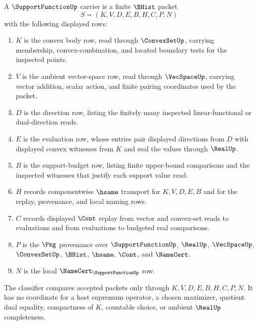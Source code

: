 \begin{definition}
\label{def:support-function-carrier}
A $\SupportFunctionUp$ carrier is a finite $\BHist$ packet
$$
S=(K,V,D,E,B,H,C,P,N)
$$
with the following displayed rows:
\begin{enumerate}
\item $K$ is the convex body row, read through $\ConvexSetUp$, carrying membership, convex-combination, and located boundary tests for the inspected points.
\item $V$ is the ambient vector-space row, read through $\VecSpaceUp$, carrying vector addition, scalar action, and finite pairing coordinates used by the packet.
\item $D$ is the direction row, listing the finitely many inspected linear-functional or dual-direction reads.
\item $E$ is the evaluation row, whose entries pair displayed directions from $D$ with displayed convex witnesses from $K$ and seal the values through $\RealUp$.
\item $B$ is the support-budget row, listing finite upper-bound comparisons and the inspected witnesses that justify each support value read.
\item $H$ records componentwise $\hsame$ transport for $K,V,D,E,B$ and for the replay, provenance, and local naming rows.
\item $C$ records displayed $\Cont$ replay from vector and convex-set reads to evaluations and from evaluations to budgeted real comparisons.
\item $P$ is the $\Pkg$ provenance over $\SupportFunctionUp$, $\RealUp$, $\VecSpaceUp$, $\ConvexSetUp$, $\BHist$, $\hsame$, $\Cont$, and $\NameCert$.
\item $N$ is the local $\NameCert_{\SupportFunctionUp}$ row.
\end{enumerate}
The classifier compares accepted packets only through $K,V,D,E,B,H,C,P,N$. It has no coordinate for a host supremum operator, a chosen maximizer, quotient dual equality, compactness of $K$, countable choice, or ambient $\RealUp$ completeness.
\end{definition}


